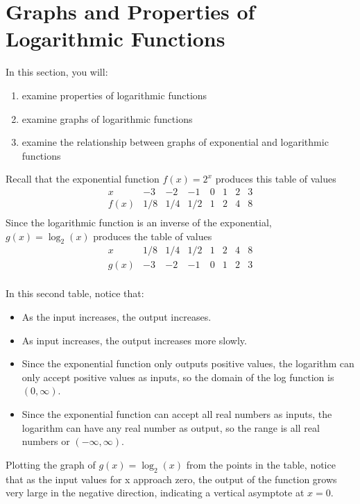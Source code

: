 \section{Graphs and Properties of Logarithmic Functions}

In this section, you will:
\begin{enumerate}
    \item examine properties of logarithmic functions
    \item examine graphs of logarithmic functions
    \item examine the relationship between graphs of exponential and logarithmic functions
\end{enumerate}


Recall that the exponential function $f(x) = 2^x$ produces this table of values
\[
    \begin{array}{c|ccccccc}
        x    & -3  & -2  & -1  & 0 & 1 & 2 & 3 \\
        \hline
        f(x) & 1/8 & 1/4 & 1/2 & 1 & 2 & 4 & 8 \\
    \end{array}
\]
Since the logarithmic function is an inverse of the exponential, $g(x) = \log_2(x)$ produces the table of values
\[
    \begin{array}{c|ccccccc}
        x    & 1/8 & 1/4 & 1/2 & 1 & 2 & 4 & 8 \\
        \hline
        g(x) & -3  & -2  & -1  & 0 & 1 & 2 & 3 \\
    \end{array}
\]

In this second table, notice that:
\begin{itemize}
    \item As the input increases, the output increases.
    \item As input increases, the output increases more slowly.
    \item Since the exponential function only outputs positive values, the logarithm can only accept positive values as inputs, so the domain of the log function is $(0, \infty)$.
    \item Since the exponential function can accept all real numbers as inputs, the logarithm can have any real number as output, so the range is all real numbers or $(-\infty, \infty)$.
\end{itemize}

Plotting the graph of $g(x) = \log_2(x)$ from the points in the table, notice that as the input values for x approach zero, the output of the function grows very large in the negative direction, indicating a vertical asymptote at $x = 0$.

